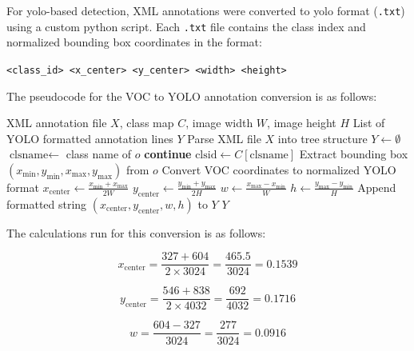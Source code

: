 For \gls{yolo}-based detection, XML annotations were converted to \gls{yolo} format (\texttt{.txt}) using a custom \gls{python} script. Each \texttt{.txt} file contains the class index and normalized bounding box coordinates in the format:

\begin{center}
\texttt{<class\_id> <x\_center> <y\_center> <width> <height>}
\end{center}

The pseudocode for the VOC to YOLO annotation conversion is as follows:

\begin{algorithm}
\caption{VOC to YOLO Annotation Conversion}
\label{algo:voc-to-yolo}
\begin{algorithmic}
\Require XML annotation file $X$, class map $C$, image width $W$, image height $H$
\Ensure List of YOLO formatted annotation lines $Y$
\State Parse XML file $X$ into tree structure
\State $Y \leftarrow \emptyset$
    \State $\text{clsname} \leftarrow$ class name of $o$
        \State \textbf{continue}
    \EndIf
    \State $\text{clsid} \leftarrow C[\text{clsname}]$
    \State Extract bounding box $(x_{\min}, y_{\min}, x_{\max}, y_{\max})$ from $o$
    \State Convert VOC coordinates to normalized YOLO format
    \State $x_{\text{center}} \leftarrow \frac{x_{\min} + x_{\max}}{2W}$
    \State $y_{\text{center}} \leftarrow \frac{y_{\min} + y_{\max}}{2H}$
    \State $w \leftarrow \frac{x_{\max} - x_{\min}}{W}$
    \State $h \leftarrow \frac{y_{\max} - y_{\min}}{H}$
    \State Append formatted string $(x_{\text{center}}, y_{\text{center}}, w, h)$ to $Y$
\EndFor
\State \Return $Y$
\end{algorithmic}
\end{algorithm}

The calculations run for this conversion is as follows:

\begin{equation}
x_{\text{center}} = \frac{327 + 604}{2 \times 3024} = \frac{465.5}{3024} = 0.1539
\label{eq:voc-yolo-x}
\end{equation}

\begin{equation}
y_{\text{center}} = \frac{546 + 838}{2 \times 4032} = \frac{692}{4032} = 0.1716
\label{eq:voc-yolo-y}
\end{equation}

\begin{equation}
w = \frac{604 - 327}{3024} = \frac{277}{3024} = 0.0916
\label{eq:voc-yolo-w}
\end{equation}

